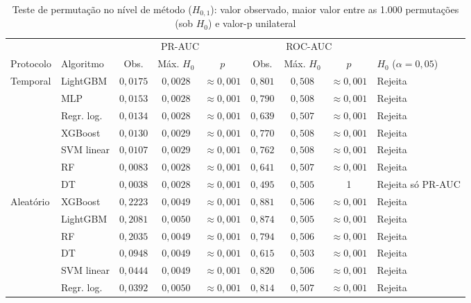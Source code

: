 \begin{table}[htbp]
    \centering
    \footnotesize
    \caption{Teste de permutação no nível de método ($H_{0,1}$): valor observado, maior valor entre as 1.000 permutações
        (sob $H_0$) e valor-p unilateral}
    \label{tab:res-hipoteses-metodo}
    \setlength{\tabcolsep}{3pt}
    \begin{tabular}{llcccccc l}
        \toprule
        & & \multicolumn{3}{c}{PR-AUC} & \multicolumn{3}{c}{ROC-AUC} & \\
        \cmidrule(lr){3-5}\cmidrule(lr){6-8}
        Protocolo & Algoritmo & Obs. & Máx. $H_0$ & $p$ & Obs. & Máx. $H_0$ & $p$ & $H_0$ ($\alpha = 0{,}05$) \\
        \midrule
        Temporal  & LightGBM   & $0{,}0175$ & $0{,}0028$ & $\approx 0{,}001$ & $0{,}801$ & $0{,}508$ & $\approx 0{,}001$ & Rejeita \\
                  & MLP        & $0{,}0153$ & $0{,}0028$ & $\approx 0{,}001$ & $0{,}790$ & $0{,}508$ & $\approx 0{,}001$ & Rejeita \\
                  & Regr. log. & $0{,}0134$ & $0{,}0028$ & $\approx 0{,}001$ & $0{,}639$ & $0{,}507$ & $\approx 0{,}001$ & Rejeita \\
                  & XGBoost    & $0{,}0130$ & $0{,}0029$ & $\approx 0{,}001$ & $0{,}770$ & $0{,}508$ & $\approx 0{,}001$ & Rejeita \\
                  & SVM linear & $0{,}0107$ & $0{,}0029$ & $\approx 0{,}001$ & $0{,}762$ & $0{,}508$ & $\approx 0{,}001$ & Rejeita \\
                  & RF         & $0{,}0083$ & $0{,}0028$ & $\approx 0{,}001$ & $0{,}641$ & $0{,}507$ & $\approx 0{,}001$ & Rejeita \\
                  & DT         & $0{,}0038$ & $0{,}0028$ & $\approx 0{,}001$ & $0{,}495$ & $0{,}505$ & 1 & Rejeita só PR-AUC \\
        \midrule
        Aleatório & XGBoost    & $0{,}2223$ & $0{,}0049$ & $\approx 0{,}001$ & $0{,}881$ & $0{,}506$ & $\approx 0{,}001$ & Rejeita \\
                  & LightGBM   & $0{,}2081$ & $0{,}0050$ & $\approx 0{,}001$ & $0{,}874$ & $0{,}505$ & $\approx 0{,}001$ & Rejeita \\
                  & RF         & $0{,}2035$ & $0{,}0049$ & $\approx 0{,}001$ & $0{,}794$ & $0{,}506$ & $\approx 0{,}001$ & Rejeita \\
                  & DT         & $0{,}0948$ & $0{,}0049$ & $\approx 0{,}001$ & $0{,}615$ & $0{,}503$ & $\approx 0{,}001$ & Rejeita \\
                  & SVM linear & $0{,}0444$ & $0{,}0049$ & $\approx 0{,}001$ & $0{,}820$ & $0{,}506$ & $\approx 0{,}001$ & Rejeita \\
                  & Regr. log. & $0{,}0392$ & $0{,}0050$ & $\approx 0{,}001$ & $0{,}814$ & $0{,}507$ & $\approx 0{,}001$ & Rejeita \\
        \bottomrule
    \end{tabular}
\end{table}%
